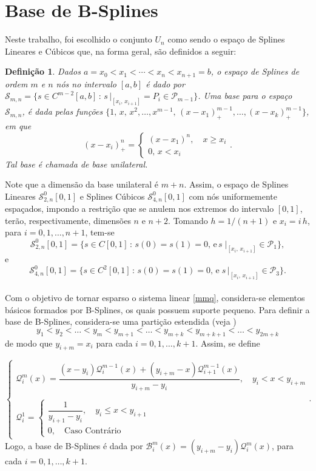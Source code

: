 \documentclass[12pt,a4paper]{report}
\newtheorem{definition}{Definição}
\begin{document}
\section*{Base de B-Splines}
 Neste trabalho, foi escolhido o conjunto $U_n$ como sendo o espaço de Splines Lineares e Cúbicos que, na forma geral,  são definidos a seguir:
\begin{definition}
Dados $a=x_0<x_1<\cdots<x_n<x_{n+1}=b$, o espaço de Splines de ordem $m$ e $n$ nós no intervalo $[a,b]$ é dado por $\mathcal{S}_{m,n}=\lbrace s\in C^{m-2}[a,b]\, :\, s\,\vert_{[x_i,\,x_{i+1}]}=P_i\in\mathcal{P}_{m-1}\rbrace$. Uma base para o espaço $\mathcal{S}_{m,n}$, é dada pelas funções $\lbrace 1,\,x,\,x^2,\dots,x^{m-1},\,(x-x_1)_{+}^{m-1},\dots,(x-x_k)_{+}^{m-1}\rbrace$, em que 
\begin{equation*}
(x-x_i)_{+}^{n} = \begin{cases}
(x-x_1)^{n},\quad x\geq x_i\\
0,\, x<x_i
\end{cases}.
\end{equation*}
Tal base é chamada de base unilateral. 
\end{definition}
Note que a dimensão da base unilateral é $m+n$. Assim, o espaço de Splines Lineares $\mathcal{S}_{2,n}^0[0,1]$ e Splines Cúbicos $\mathcal{S}_{4,n}^0[0,1]$ com nós uniformemente espaçados, impondo a restrição que se anulem nos extremos do intervalo $[0,1]$, terão, respectivamente, dimensões $n$ e $n+2$. Tomando $h=1/(n+1)$ e $x_i=i\, h$, para $i=0,1,\dots,n+1$, tem-se $$\mathcal{S}_{2,n}^0[0,1]=\lbrace s\in C[0,1]\, :\, s(0)=s(1)=0,\,\text{e}\, s\;\vert_{[x_i,\,x_{i+1}]}\in\mathcal{P}_1\rbrace ,$$ e $$\mathcal{S}_{4,n}^0[0,1]=\lbrace s\in C^2[0,1]\, :\, s(0)=s(1)=0,\,\text{e}\; s\,\vert_{[x_i,\,x_{i+1}]}\in\mathcal{P}_3\rbrace .$$\\

Com o objetivo de tornar esparso o sistema linear \eqref{mmq}, considera-se elementos básicos formados por B-Splines, os quais possuem suporte pequeno. Para definir a base de B-Splines, considera-se uma partição estendida (veja \cite{lar})$$y_1<y_2<\dots <y_m<y_{m+1}<\dots <y_{m+k}<y_{m+k+1}<\dots <y_{2m+k}$$ de modo que $y_{i+m}=x_i$ para cada $i = 0,1,\dots,k+1$. Assim, se define 

\begin{equation}\label{Qis}
\begin{cases}
\mathcal{Q}_i^m(x) = \dfrac{(x-y_i)\mathcal{Q}_i^{m-1}(x)+(y_{i+m}-x)\mathcal{Q}_{i+1}^{m-1}(x)}{y_{i+m}-y_i},\quad y_i<x<y_{i+m}\\
\\
\mathcal{Q}_i^1=
\begin{cases}
\dfrac{1}{y_{i+1}-y_i},\quad y_i\leq x<y_{i+1}\\[0.3cm]
0, \quad\text{Caso Contrário} 
\end{cases}
\end{cases}.
\end{equation}
Logo, a base de B-Splines é dada por $\mathcal{B}_i^m(x)=(y_{i+m}-y_i)\mathcal{Q}_i^m(x)$, para cada $i = 0,1,\dots,k+1$.
\end{document}
